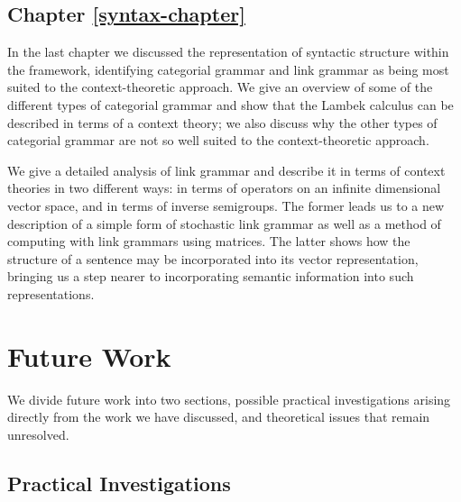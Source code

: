 \subsection*{Chapter \ref{syntax-chapter}}

In the last chapter we discussed the representation of syntactic structure within the framework, identifying categorial grammar and link grammar as being most suited to the context-theoretic approach. We give an overview of some of the different types of categorial grammar and show that the Lambek calculus can be described in terms of a context theory; we also discuss why the other types of categorial grammar are not so well suited to the context-theoretic approach.

We give a detailed analysis of link grammar and describe it in terms of context theories in two different ways: in terms of operators on an infinite dimensional vector space, and in terms of inverse semigroups. The former leads us to a new description of a simple form of stochastic link grammar as well as a method of computing with link grammars using matrices. The latter shows how the structure of a sentence may be incorporated into its vector representation, bringing us a step nearer to incorporating semantic information into such representations.

\section{Future Work}

We divide future work into two sections, possible practical investigations arising directly from the work we have discussed, and theoretical issues that remain unresolved.

\subsection{Practical Investigations}

